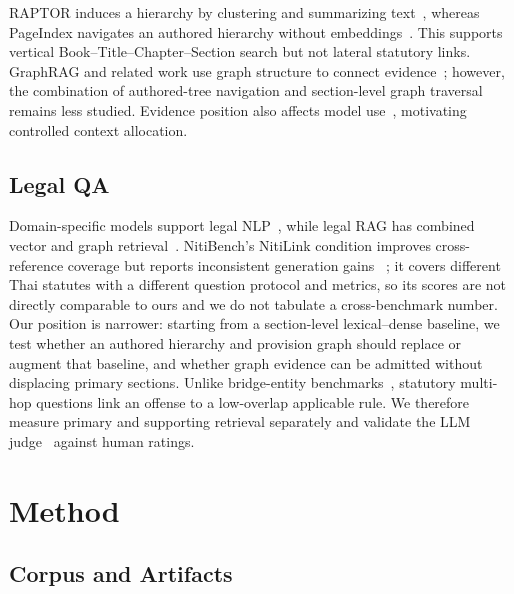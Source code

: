 \documentclass[conference]{IEEEtran}
\begin{document}
RAPTOR induces a hierarchy by clustering and summarizing text~\cite{sarthi2024raptor}, whereas
PageIndex navigates an authored hierarchy without embeddings~\cite{pageindex}. This supports
vertical Book--Title--Chapter--Section search but not lateral statutory links. GraphRAG and related
work use graph structure to connect evidence~\cite{edge2024graphrag,pan2024unifying}; however, the
combination of authored-tree navigation and section-level graph traversal remains less studied.
Evidence position also affects model use~\cite{liu2024lostmiddle}, motivating controlled context
allocation.

\subsection{Legal QA}

Domain-specific models support legal NLP~\cite{chalkidis2020legalbert}, while legal RAG has combined
vector and graph retrieval~\cite{barron2026bridging}. NitiBench's NitiLink condition improves
cross-reference coverage but reports inconsistent generation gains
~\cite{akarajaradwong2025nitibench}; it covers different Thai statutes with a different question
protocol and metrics, so its scores are not directly comparable to ours and we do not tabulate a
cross-benchmark number. Our position is narrower: starting from a section-level
lexical--dense baseline, we test whether an authored hierarchy and provision graph should replace or
augment that baseline, and whether graph evidence can be admitted without displacing primary
sections. Unlike bridge-entity benchmarks~\cite{yang2018hotpotqa,trivedi2022musique}, statutory
multi-hop questions link an offense to a low-overlap applicable rule. We therefore measure primary
and supporting retrieval separately and validate the LLM judge~\cite{zheng2023judging} against human
ratings.

\section{Method}

\subsection{Corpus and Artifacts}
\end{document}
